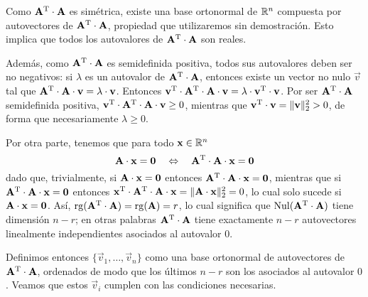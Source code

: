 Como $\mathbf{A}^{\mathrm{T}} \cdot \mathbf{A}$ es simétrica, existe una base ortonormal de
$\mathbb{R}^n$ compuesta por autovectores de $\mathbf{A}^{\mathrm{T}} \cdot \mathbf{A}$,
propiedad que utilizaremos sin demostración. Esto implica que todos los
autovalores de $\mathbf{A}^{\mathrm{T}} \cdot \mathbf{A}$ son reales.

Además, como $\mathbf{A}^{\mathrm{T}} \cdot \mathbf{A}$ es semidefinida positiva, todos sus autovalores deben
ser no negativos: si $\lambda$ es un autovalor de $\mathbf{A}^{\mathrm{T}} \cdot \mathbf{A}$, entonces existe
un vector no nulo $\vec{v}$ tal que $\mathbf{A}^{\mathrm{T}} \cdot \mathbf{A} \cdot \mathbf{v} = \lambda \cdot
\mathbf{v}$. Entonces $\mathbf{v}^{\mathrm{T}} \cdot \mathbf{A}^{\mathrm{T}} \cdot \mathbf{A} \cdot \mathbf{v} = \lambda \cdot
\mathbf{v}^{\mathrm{T}} \cdot \mathbf{v}$. Por ser $\mathbf{A}^{\mathrm{T}} \cdot \mathbf{A}$ semidefinida positiva,
$\mathbf{v}^{\mathrm{T}} \cdot \mathbf{A}^{\mathrm{T}} \cdot \mathbf{A} \cdot \mathbf{v} \geq 0$, mientras que
$\mathbf{v}^{\mathrm{T}} \cdot \mathbf{v} = \lVert \mathbf{v} \rVert_2^2 > 0$, de forma que
necesariamente $\lambda \geq 0$.

Por otra parte, tenemos que para todo $\mathbf{x} \in \mathbb{R}^n$
\[ \mathbf{A} \cdot \mathbf{x} = \mathbf{0} \quad \Leftrightarrow \quad
    \mathbf{A}^{\mathrm{T}} \cdot \mathbf{A} \cdot \mathbf{x} = \mathbf{0} \]
dado que, trivialmente, si $\mathbf{A} \cdot \mathbf{x} = \mathbf{0}$ entonces
$\mathbf{A}^{\mathrm{T}} \cdot \mathbf{A} \cdot \mathbf{x} = \mathbf{0}$, mientras que si
$\mathbf{A}^{\mathrm{T}} \cdot \mathbf{A} \cdot \mathbf{x} = \mathbf{0}$ entonces
$\mathbf{x}^{\mathrm{T}} \cdot \mathbf{A}^{\mathrm{T}} \cdot \mathbf{A} \cdot \mathbf{x}
    = \lVert \mathbf{A} \cdot \mathbf{x} \rVert_2^2 = 0$, lo cual solo sucede si
$\mathbf{A} \cdot \mathbf{x} = \mathbf{0}$.
Así, $\operatorname{rg}(\mathbf{A}^{\mathrm{T}} \cdot \mathbf{A}) = \operatorname{rg}(\mathbf{A}) = r$, lo cual significa
que $\operatorname{Nul}(\mathbf{A}^{\mathrm{T}} \cdot \mathbf{A})$ tiene dimensión $n-r$; en otras
palabras $\mathbf{A}^{\mathrm{T}} \cdot \mathbf{A}$ tiene exactamente $n - r$ autovectores
linealmente independientes asociados al autovalor $0$.

Definimos entonces $\lbrace \vec{v}_1, \dots, \vec{v}_n \rbrace$ como una base
ortonormal de autovectores de $\mathbf{A}^{\mathrm{T}} \cdot \mathbf{A}$, ordenados de modo
que los últimos $n-r$ son los asociados al autovalor $0$.
Veamos que estos $\vec{v}_i$ cumplen con las condiciones necesarias.

